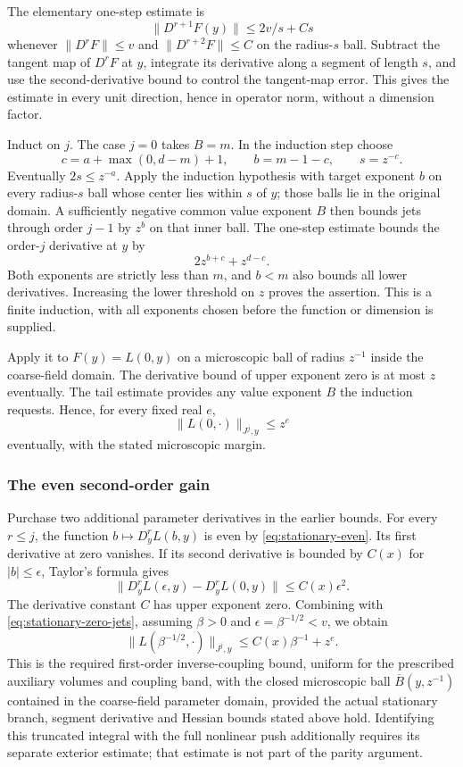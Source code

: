 The elementary one-step estimate is
\[
             \|D^{r+1}F(y)\|\le 2v/s+Cs
\]
whenever $\|D^rF\|\le v$ and $\|D^{r+2}F\|\le C$ on the
radius-$s$ ball. Subtract the tangent map of $D^rF$ at $y$,
integrate its derivative along a segment of length $s$, and use
the second-derivative bound to control the tangent-map error.
This gives the estimate in every unit direction, hence in operator
norm, without a dimension factor.

Induct on $j$. The case $j=0$ takes $B=m$. In the induction step
choose
\[
 c=a+\max(0,d-m)+1,\qquad b=m-1-c,\qquad s=z^{-c}.
\]
Eventually $2s\le z^{-a}$. Apply the induction hypothesis with target
exponent $b$ on every radius-$s$ ball whose center lies within $s$
of $y$; those balls lie in the original domain. A sufficiently
negative common value exponent $B$ then bounds jets through order
$j-1$ by $z^b$ on that inner ball. The one-step estimate bounds the
order-$j$ derivative at $y$ by
\[
                            2z^{b+c}+z^{d-c}.
\]
Both exponents are strictly less than $m$, and $b<m$ also bounds
all lower derivatives. Increasing the lower threshold on $z$
proves the assertion. This is a finite induction, with all exponents
chosen before the function or dimension is supplied.

Apply it to $F(y)=L(0,y)$ on a microscopic ball of radius
$z^{-1}$ inside the coarse-field domain. The derivative bound of
upper exponent zero is at most $z$ eventually. The tail estimate
provides any value exponent $B$ the induction requests. Hence,
for every fixed real $e$,
\begin{equation}\label{eq:stationary-zero-jets}
                       \|L(0,\cdot)\|_{J^j,y}\le z^e
\end{equation}
eventually, with the stated microscopic margin.

\subsubsection{The even second-order gain}
Purchase two additional parameter derivatives in the earlier
bounds. For every $r\le j$, the function
$b\mapsto D_y^rL(b,y)$ is even by
\eqref{eq:stationary-even}. Its first derivative at zero vanishes.
If its second derivative is bounded by $C(x)$ for $|b|\le\epsilon$,
Taylor's formula gives
\[
 \|D_y^rL(\epsilon,y)-D_y^rL(0,y)\|
                         \le C(x)\epsilon^2.
\]
The derivative constant $C$ has upper exponent zero. Combining with
\eqref{eq:stationary-zero-jets}, assuming $\beta>0$ and $\epsilon=\beta^{-1/2}<v$, we obtain
\begin{equation}\label{eq:stationary-log-price}
             \|L(\beta^{-1/2},\cdot)\|_{J^j,y}
                              \le C(x)\beta^{-1}+z^e.
\end{equation}
This is the required first-order inverse-coupling bound, uniform
for the prescribed auxiliary volumes and coupling band, with the
closed microscopic ball $\overline B(y,z^{-1})$ contained in the
coarse-field parameter domain, provided
the actual stationary branch, segment derivative and Hessian bounds
stated above hold. Identifying this truncated integral with the
full nonlinear push additionally requires its separate exterior
estimate; that estimate is not part of the parity argument.
